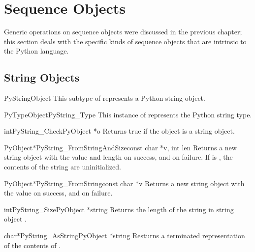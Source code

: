\documentclass{manual}
\begin{document}
\section{Sequence Objects \label{sequenceObjects}}

Generic operations on sequence objects were discussed in the previous 
chapter; this section deals with the specific kinds of sequence 
objects that are intrinsic to the Python language.


\subsection{String Objects \label{stringObjects}}

\begin{ctypedesc}{PyStringObject}
This subtype of  represents a Python string object.
\end{ctypedesc}

\begin{cvardesc}{PyTypeObject}{PyString_Type}
This instance of  represents the Python string type.
\end{cvardesc}

\begin{cfuncdesc}{int}{PyString_Check}{PyObject *o}
Returns true if the object  is a string object.
\end{cfuncdesc}

\begin{cfuncdesc}{PyObject*}{PyString_FromStringAndSize}{const char *v,
                                                          int len}
Returns a new string object with the value  and length
 on success, and \NULL{} on failure.  If  is \NULL{},
the contents of the string are uninitialized.
\end{cfuncdesc}

\begin{cfuncdesc}{PyObject*}{PyString_FromString}{const char *v}
Returns a new string object with the value  on success, and
\NULL{} on failure.
\end{cfuncdesc}

\begin{cfuncdesc}{int}{PyString_Size}{PyObject *string}
Returns the length of the string in string object .
\end{cfuncdesc}

\begin{cfuncdesc}{char*}{PyString_AsString}{PyObject *string}
Resturns a \NULL{} terminated representation of the contents of .
\end{cfuncdesc}
\end{document}

